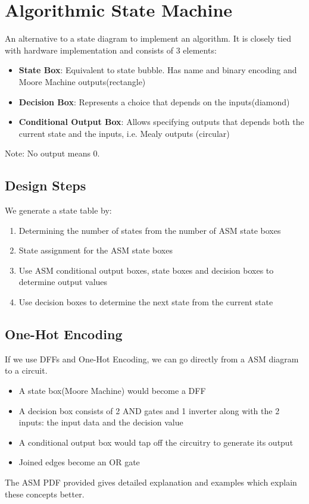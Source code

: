 \documentclass[12pt]{report}
\begin{document}
	\section{Algorithmic State Machine}
		An alternative to a state diagram to implement an algorithm. It is closely tied with hardware implementation and consists of 3 elements:\\
		\begin{itemize}
			\item \textbf{State Box}: Equivalent to state bubble. Has name and binary encoding and Moore Machine outputs(rectangle)
			\item \textbf{Decision Box}: Represents a choice that depends on the inputs(diamond)
			\item \textbf{Conditional Output Box}: Allows specifying outputs that depends both the current state and the inputs, i.e. Mealy outputs (circular)
		\end{itemize}
		Note: No output means 0.
		\subsection{Design Steps}
			We generate a state table by:
			\begin{enumerate}
				\item Determining the number of states from the number of ASM state boxes
				\item State assignment for the ASM state boxes
				\item Use ASM conditional output boxes, state boxes and decision boxes to determine output values
				\item Use decision boxes to determine the next state from the current state
			\end{enumerate}
		\subsection{One-Hot Encoding}
			If we use DFFs and One-Hot Encoding, we can go directly from a ASM diagram to a circuit.
			\begin{itemize}
				\item A state box(Moore Machine) would become a DFF
				\item A decision box consists of 2 AND gates and 1 inverter along with the 2 inputs: the input data and the decision value
				\item A conditional output box would tap off the circuitry to generate its output
				\item Joined edges become an OR gate
			\end{itemize}
			The ASM PDF provided gives detailed explanation and examples which explain these concepts better.
\end{document}
